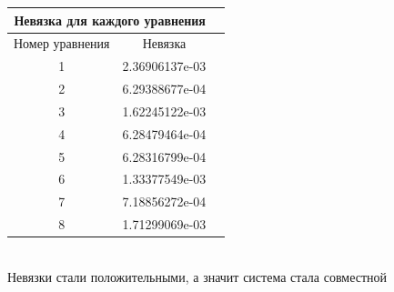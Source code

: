 \documentclass[a4paper,12pt]{article}
\begin{document}
\begin{center}
\begin{tabular}{|c|c|c|}
\hline
\multicolumn{2}{|c|}{Невязка для каждого уравнения}\\
\hline
Номер уравнения&Невязка\\
\hline
1&2.36906137e-03\\
\hline
2&6.29388677e-04\\
\hline
3&1.62245122e-03\\
\hline
4&6.28479464e-04\\
\hline
5&6.28316799e-04\\
\hline
6&1.33377549e-03\\
\hline
7&7.18856272e-04\\
\hline
8&1.71299069e-03
\end{tabular}
\end{center}\\

Невязки стали положительными, а значит система стала совместной \\

\newpage
\end{document}
